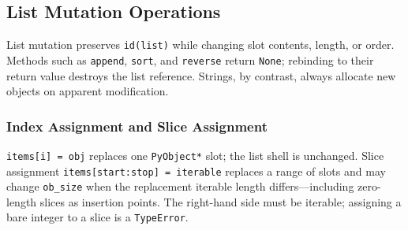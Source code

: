 \subsection{List Mutation Operations}

List mutation preserves \texttt{id(list)} while changing slot contents, length, or order. Methods such as \texttt{append}, \texttt{sort}, and \texttt{reverse} return \texttt{None}; rebinding to their return value destroys the list reference. Strings, by contrast, always allocate new objects on apparent modification.

\subsubsection{Index Assignment and Slice Assignment}

\texttt{items[i] = obj} replaces one \texttt{PyObject*} slot; the list shell is unchanged. Slice assignment \texttt{items[start:stop] = iterable} replaces a range of slots and may change \texttt{ob\_size} when the replacement iterable length differs---including zero-length slices as insertion points. The right-hand side must be iterable; assigning a bare integer to a slice is a \texttt{TypeError}.
